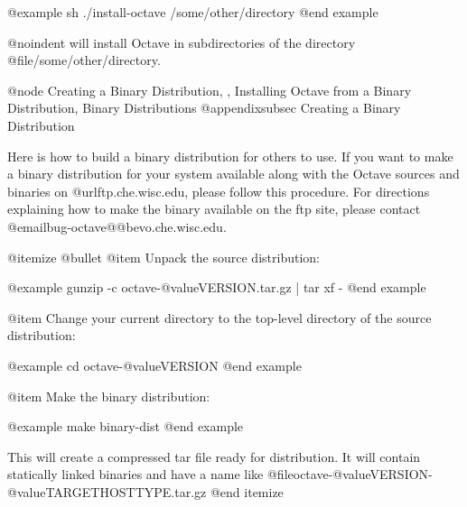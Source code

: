 @example
sh ./install-octave /some/other/directory
@end example

@noindent
will install Octave in subdirectories of the directory
@file{/some/other/directory}.

@node Creating a Binary Distribution,  , Installing Octave from a Binary Distribution, Binary Distributions
@appendixsubsec Creating a Binary Distribution

Here is how to build a binary distribution for others to use.  If you
want to make a binary distribution for your system available along with
the Octave sources and binaries on @url{ftp.che.wisc.edu}, please follow
this procedure.  For directions explaining how to make the binary
available on the ftp site, please contact
@email{bug-octave@@bevo.che.wisc.edu}.

@itemize @bullet
@item
Unpack the source distribution:

@example
gunzip -c octave-@value{VERSION}.tar.gz | tar xf -
@end example

@item
Change your current directory to the top-level directory of the source
distribution:

@example
cd octave-@value{VERSION}
@end example

@item
Make the binary distribution:

@example
make binary-dist
@end example

This will create a compressed tar file ready for distribution.
It will contain statically linked binaries and have a name like
@file{octave-@value{VERSION}-@value{TARGETHOSTTYPE}.tar.gz}
@end itemize
